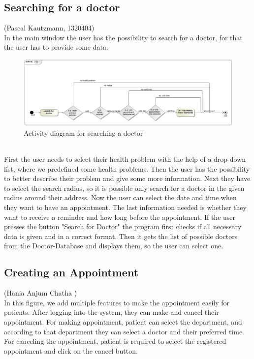 \documentclass[a4paper, 12pt]{report}
\begin{document}
\subsection{Searching for a doctor}
{\tiny (Pascal Kautzmann, 1320404)\\}
In the main window the user has the possibility to search for a doctor, for that the user has to provide some data.
\begin{figure}[!h]
\includegraphics[width=\linewidth]{doctorsearch.jpg} 
\caption{Activity diagram for searching a doctor}
\end{figure}
\\First the user needs to select their health problem with the help of a drop-down list, where we predefined some health problems.
Then the user has the possibility to better describe their problem and give some more information.
Next they have to select the search radius, so it is possible only search for a doctor in the given radius around their address.
Now the user can select the date and time when they want to have an appointment.
The last information needed is whether they want to receive a reminder and how long before the appointment.
If the user presses the button "Search for Doctor" the program first checks if all necessary data is given and in a correct format. Then it gets the list of possible doctors from the Doctor-Database and displays them, so the user can select one.


\subsection{Creating an Appointment}
{\tiny (Hania Anjum Chatha )\\}
In this figure, we add multiple features to make the appointment easily for patients. After logging into the system, they can make and cancel their appointment. For making appointment, patient can select the department, and according to that department they can select a doctor and their preferred time. For canceling the appointment, patient is required to select the registered appointment and click on the cancel button.
\end{document}
